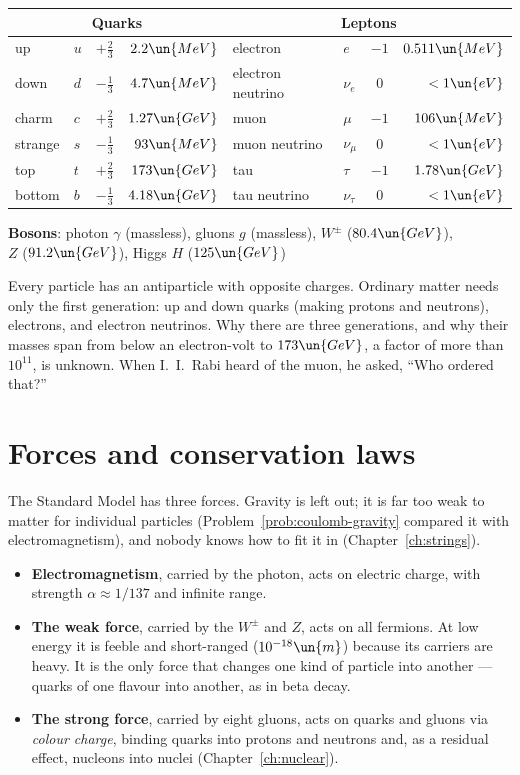 \begin{center}
\small
\renewcommand{\arraystretch}{1.15}
\begin{tabular}{@{}l l c r@{\qquad}l l c r@{}}
\toprule
\multicolumn{4}{c}{\textbf{Quarks}} & \multicolumn{4}{c}{\textbf{Leptons}}\\
\midrule
up & $u$ & $+\tfrac23$ & $2.2\un{MeV}$ & electron & $e$ & $-1$ & $0.511\un{MeV}$\\
down & $d$ & $-\tfrac13$ & $4.7\un{MeV}$ & electron neutrino & $\nu_e$ & $0$ & $<1\un{eV}$\\
charm & $c$ & $+\tfrac23$ & $1.27\un{GeV}$ & muon & $\mu$ & $-1$ & $106\un{MeV}$\\
strange & $s$ & $-\tfrac13$ & $93\un{MeV}$ & muon neutrino & $\nu_\mu$ & $0$ & $<1\un{eV}$\\
top & $t$ & $+\tfrac23$ & $173\un{GeV}$ & tau & $\tau$ & $-1$ & $1.78\un{GeV}$\\
bottom & $b$ & $-\tfrac13$ & $4.18\un{GeV}$ & tau neutrino & $\nu_\tau$ & $0$ & $<1\un{eV}$\\
\bottomrule
\end{tabular}

\smallskip
\textbf{Bosons}: photon $\gamma$ (massless), gluons $g$ (massless), $W^\pm$ ($80.4\un{GeV}$),\\ $Z$ ($91.2\un{GeV}$), Higgs $H$ ($125\un{GeV}$)
\end{center}

Every particle has an antiparticle with opposite charges. Ordinary matter needs only the first generation: up and down quarks (making protons and neutrons), electrons, and electron neutrinos. Why there are three generations, and why their masses span from below an electron-volt to $173\un{GeV}$, a factor of more than $10^{11}$, is unknown. When I.~I.~Rabi heard of the muon, he asked, ``Who ordered that?''

\section{Forces and conservation laws}

The Standard Model has three forces. Gravity is left out; it is far too weak to matter for individual particles (Problem~\ref{prob:coulomb-gravity} compared it with electromagnetism), and nobody knows how to fit it in (Chapter~\ref{ch:strings}).
\begin{itemize}[itemsep=3pt]
  \item \textbf{Electromagnetism}, carried by the photon, acts on electric charge, with strength $\alpha\approx1/137$ and infinite range.
  \item \textbf{The weak force}, carried by the $W^\pm$ and $Z$, acts on all fermions. At low energy it is feeble and short-ranged ($10^{-18}\un{m}$) because its carriers are heavy. It is the only force that changes one kind of particle into another --- quarks of one flavour into another, as in beta decay.
  \item \textbf{The strong force}, carried by eight gluons, acts on quarks and gluons via \emph{colour charge}, binding quarks into protons and neutrons and, as a residual effect, nucleons into nuclei (Chapter~\ref{ch:nuclear}).
\end{itemize}

